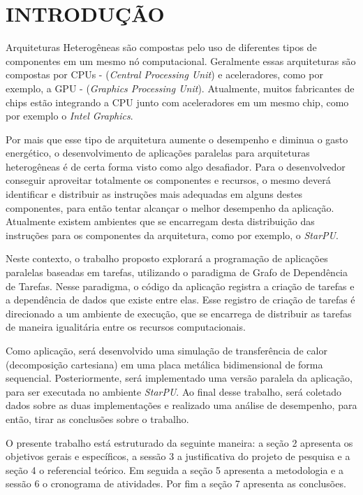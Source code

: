 
\chapter{INTRODUÇÃO}
\label{chap:introducao}

Arquiteturas Heterogêneas são compostas pelo uso de diferentes tipos de componentes em um mesmo nó computacional. Geralmente essas arquiteturas são compostas por CPUs - (\emph{Central Processing Unit}) e aceleradores, como por exemplo, a GPU - (\emph{Graphics Processing Unit}). Atualmente, muitos fabricantes de chips estão integrando a CPU junto com aceleradores em um mesmo chip, como por exemplo o \emph{Intel Graphics}. 

Por mais que esse tipo de arquitetura aumente o desempenho e diminua o gasto energético, o desenvolvimento de aplicações paralelas para arquiteturas heterogêneas é de certa forma visto como algo desafiador. Para o desenvolvedor conseguir aproveitar totalmente os componentes e recursos, o mesmo deverá identificar e distribuir as instruções mais adequadas em alguns destes componentes, para então tentar alcançar o melhor desempenho da aplicação. Atualmente existem ambientes que se encarregam desta distribuição das instruções para os componentes da arquitetura, como por exemplo, o \emph{StarPU}.

Neste contexto, o trabalho proposto explorará a programação de aplicações paralelas baseadas em tarefas, utilizando o paradigma de Grafo de Dependência de Tarefas. Nesse paradigma, o código da aplicação registra a criação de tarefas e a dependência de dados que existe entre elas. Esse registro de criação de tarefas é direcionado a um ambiente de execução, que se encarrega de distribuir as tarefas de maneira igualitária entre os recursos computacionais.

Como aplicação, será desenvolvido uma simulação de transferência de calor (decomposição cartesiana) em uma placa metálica bidimensional de forma sequencial. Posteriormente, será implementado uma versão paralela da aplicação, para ser executada no ambiente \emph{StarPU}. Ao final desse trabalho, será coletado dados sobre as duas implementações e realizado uma análise de desempenho, para então, tirar as conclusões sobre o trabalho.

O presente trabalho está estruturado da seguinte maneira: a seção 2 apresenta os objetivos gerais e específicos, a sessão 3 a justificativa do projeto de pesquisa e a seção 4 o referencial teórico. Em seguida a seção 5 apresenta a metodologia e a sessão 6 o cronograma de atividades. Por fim a seção 7 apresenta as conclusões.